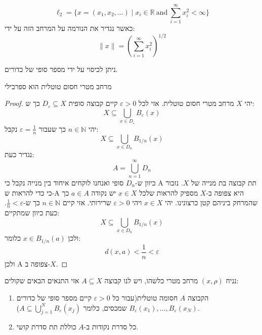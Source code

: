 \documentclass{tstextbook}
\begin{document}
\begin{definition}
$$\ell_{2}={\Bigg\{}x=\left(x_{1},x_{2},\dots\right)\mid x_{i}\in\mathbb{R}{\mathrm{~and~}}\sum_{i=1}^{\infty}x_{i}^{2}<\infty{\Bigg\}}$$
כאשר נגדיר את הנורמה על המרחב הזה על ידי:
$$\|x\|=\left(\sum_{i=1}^{\infty}x_{i}^{2}\right)^{1/2}$$

\end{definition}
\begin{definition}
ניתן לכיסוי על ידי מספר סופי של כדורים.

\end{definition}
\begin{proposition}
מרחב מטרי חסום טוטלית הוא ספרבילי

\end{proposition}
\begin{proof}
יהי \(X\) מרחב מטרי חסום טוטלית. אזי לכל \(\varepsilon> 0\) קיים קבוצה סופית \(D_{\varepsilon}\subseteq X\) כך ש:
$$X\subseteq\bigcup_{x \in D_{\varepsilon}}B_{\varepsilon}(x)$$
יהי \(n \in \mathbb{N}\) כך שעבור \(\varepsilon=\frac{1}{n}\) נקבל:
$${ X}\subseteq\bigcup_{x\in D_{n}}B_{1/n}(x) $$
נגדיר כעת:
$$A=\bigcup_{n=1}^{\infty}D_{n}$$
כיוון ש-\(D_{n}\) סופי ואנחנו לוקחים איחוד בין מנייה נקבל כי A תת קבוצה בת מנייה של \(X\).
נזכור כי כדי להראות ש-A היא צפופה ב-\(X\) מספיק להראות שלכל \(x \in X\) יש נקודה \(a \in A\) כך שהמרחק ביניהם קטן כרצונינו.
יהי \(x \in X\) ויהי \(\varepsilon> 0\) שרירותי. אזי קיים \(n\in \mathbb{N}\) כך ש-\(\frac{1}{n}< \varepsilon\). כעת כיוון שמתקיים:
$$X\subseteq\bigcup_{x\in D_{n}}B_{1/n}(x)$$
ולכן \(x \in B_{1 / n}(a)\) כלומר:
$$d(x,a)<{\frac{1}{n}}<\varepsilon$$
ולכן A צפופה ב-\(X\).

\end{proof}
\begin{theorem}
נניח \((x,\rho)\) מרחב מטרי כלשהו, ויש לנו קבוצה \(A\subseteq X\) אזי התנאים הבאים שקולים:

  \begin{enumerate}
    \item הקבוצה \(A\) חסומה טוטלית(עבור כל \(\varepsilon> 0\) קיים מספר סופי של כדורים \(B_{\varepsilon}(x_{1}),\dots,B_{\varepsilon}(x_{N})\) שמכסים, כלומר \(A\subseteq \bigcup_{j=1}^{N}B_{\varepsilon}(x_{j})\)). 


    \item כל סדרת נקודות ב-\(A\) כוללת תת סדרת קושי. 


  \end{enumerate}
\end{theorem}
\end{document}
